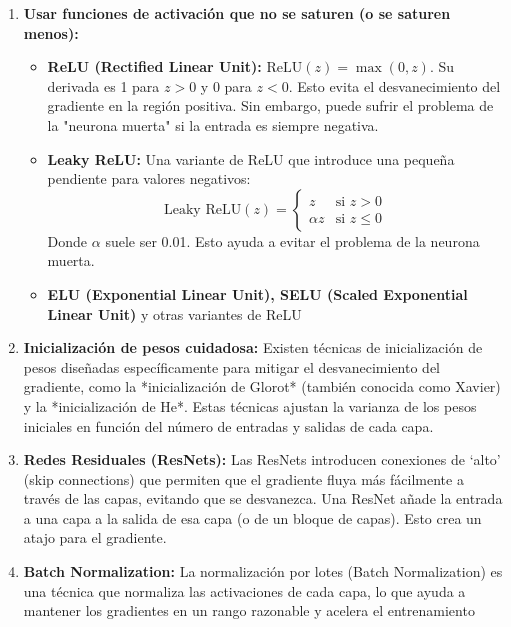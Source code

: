 \documentclass{article}
\begin{document}
\begin{enumerate}
    \item \textbf{Usar funciones de activación que no se saturen (o se saturen menos):}
        \begin{itemize}
            \item \textbf{ReLU (Rectified Linear Unit):}  \(\text{ReLU}(z) = \max(0, z)\).  Su derivada es 1 para \(z > 0\) y 0 para \(z < 0\).  Esto evita el desvanecimiento del gradiente en la región positiva.  Sin embargo, puede sufrir el problema de la "neurona muerta" si la entrada es siempre negativa.
            \item \textbf{Leaky ReLU:}  Una variante de ReLU que introduce una pequeña pendiente para valores negativos:
            \[
             \text{Leaky ReLU}(z) = \begin{cases}
             z & \text{si } z > 0 \\
             \alpha z & \text{si } z \leq 0
             \end{cases}
            \]
            Donde \(\alpha\) suele ser 0.01. Esto ayuda a evitar el problema de la neurona muerta.
            \item \textbf{ELU (Exponential Linear Unit), SELU (Scaled Exponential Linear Unit)} y otras variantes de ReLU
         \end{itemize}
    \item \textbf{Inicialización de pesos cuidadosa:}  Existen técnicas de inicialización de pesos diseñadas específicamente para mitigar el desvanecimiento del gradiente, como la *inicialización de Glorot* (también conocida como Xavier) y la *inicialización de He*. Estas técnicas ajustan la varianza de los pesos iniciales en función del número de entradas y salidas de cada capa.

    \item \textbf{Redes Residuales (ResNets):}  Las ResNets introducen conexiones de `alto' (skip connections) que permiten que el gradiente fluya más fácilmente a través de las capas, evitando que se desvanezca.  Una ResNet añade la entrada a una capa a la salida de esa capa (o de un bloque de capas). Esto crea un atajo para el gradiente.

    \item \textbf{Batch Normalization:} La normalización por lotes (Batch Normalization) es una técnica que normaliza las activaciones de cada capa, lo que ayuda a mantener los gradientes en un rango razonable y acelera el entrenamiento

\end{enumerate}
\end{document}
